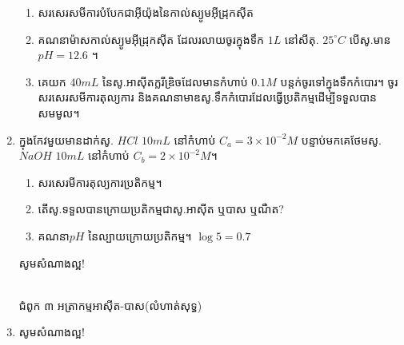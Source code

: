 \documentclass[12pt, a4paper]{article}
\begin{document}
\begin{enumerate}[m]
	\begin{enumerate}[k]
		\item សរសេរសមីការបំបែកជាអ៊ីយ៉ុងនៃកាល់ស្យូមអ៊ីដ្រុកស៊ីត
		\item គណនាម៉ាសកាល់ស្យូមអ៊ីដ្រុកស៊ីត ដែលរលាយចូរក្នុងទឹក $1L$ នៅសីតុ. $25^\circ C$ បើសូ.មាន$pH=12.6$ ។
		\item គេយក $40mL$ នៃសូ.អាស៊ីតក្លរីឌ្រិចដែលមានកំហាប់ $0.1M$ បន្តក់ចូរទៅក្នុងទឹកកំបោរ។
		ចូរសរសេរសមីការតុល្យការ និងគណនាមាឌសូ.ទឹកកំបោរដែលធ្វើប្រតិកម្មដើម្បីទទួលបានសមមូល។
	\end{enumerate}
	\item ក្នុងកែវមួយមានដាក់សូ. $HCl$ $10mL$ នៅកំហាប់ $C_a=3\times10^{-2}M$ បន្ទាប់មកគេថែមសូ. $NaOH$ $10mL$ នៅកំហាប់ $C_b=2\times10^{-2}M$។
	\begin{enumerate}[k]
		\item សរសេរមីការតុល្យការប្រតិកម្ម។
		\item តើសូ.ទទួលបានក្រោយប្រតិកម្មជាសូ.អាស៊ីត ឬបាស ឬណឺត?
		\item គណនា$pH$ នៃល្បាយក្រោយប្រតិកម្ម។ $\log5=0.7$
	\end{enumerate}
	\begin{center}
		\sffamily\color{black}
		សូមសំណាងល្អ!
	\end{center}\newpage
	\begin{center}
		\sffamily\color{black}
		\\
		ជំពូក ៣ អត្រាកម្មអាស៊ីត-បាស(លំហាត់សុទ្ធ)
	\end{center}
	\item 
	\begin{center}
		\sffamily\color{black}
		សូមសំណាងល្អ!
	\end{center}\newpage
\end{enumerate}
\end{document}
